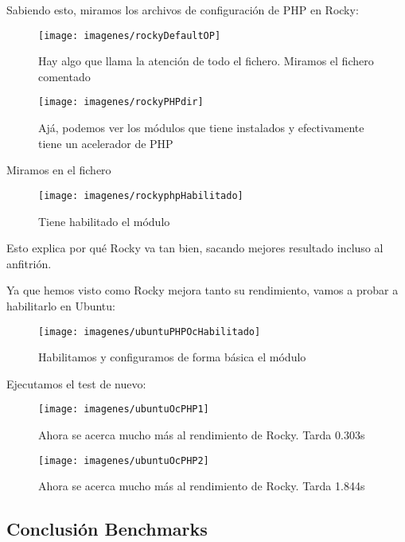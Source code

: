 Sabiendo esto, miramos los archivos de configuración de PHP  en Rocky:
\begin{figure}[H]
	\centering
	\texttt{[image: imagenes/rockyDefaultOP]}
	\caption{Hay algo que llama la atención de todo el fichero. Miramos el fichero comentado}
	\label{fig:rockydefaultop}
\end{figure}

\begin{figure}[H]
	\centering
	\texttt{[image: imagenes/rockyPHPdir]}
	\caption{Ajá, podemos ver los módulos que tiene instalados y efectivamente tiene un acelerador de PHP}
	\label{fig:rockyphpdir}
\end{figure}
Miramos en el fichero 
\begin{figure}[H]
	\centering
	\texttt{[image: imagenes/rockyphpHabilitado]}
	\caption{Tiene habilitado el módulo}
	\label{fig:rockyphphabilitado}
\end{figure}
Esto explica por qué Rocky va tan bien, sacando mejores resultado incluso al anfitrión.

Ya que hemos visto como Rocky mejora tanto su rendimiento, vamos a probar a habilitarlo en Ubuntu:
\begin{figure}[H]
	\centering
	\texttt{[image: imagenes/ubuntuPHPOcHabilitado]}
	\caption{Habilitamos y configuramos de forma básica el módulo}
	\label{fig:ubuntuphpochabilitado}
\end{figure}

Ejecutamos el test de nuevo:
\begin{figure}[H]
	\centering
	\texttt{[image: imagenes/ubuntuOcPHP1]}
	\caption{Ahora se acerca mucho más al rendimiento de Rocky. Tarda 0.303s}
	\label{fig:ubuntuocphp1}
\end{figure}
\begin{figure}[H]
	\centering
	\texttt{[image: imagenes/ubuntuOcPHP2]}
	\caption{Ahora se acerca mucho más al rendimiento de Rocky. Tarda 1.844s \cite{ubuntuPHPoc}}
	\label{fig:ubuntuocphp2}
\end{figure}


\subsection{Conclusión Benchmarks}

